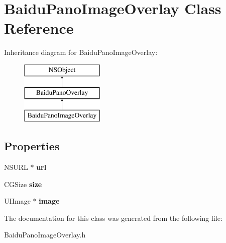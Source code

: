 \hypertarget{interface_baidu_pano_image_overlay}{}\section{Baidu\+Pano\+Image\+Overlay Class Reference}
\label{interface_baidu_pano_image_overlay}
Inheritance diagram for Baidu\+Pano\+Image\+Overlay\+:\begin{figure}[H]
\begin{center}
\leavevmode
\includegraphics[height=3.000000cm]{interface_baidu_pano_image_overlay}
\end{center}
\end{figure}
\subsection*{Properties}
\begin{DoxyCompactItemize}
\item 
\hypertarget{interface_baidu_pano_image_overlay_ac35f2d117bb3368422a657d2d01fcf96}{}N\+S\+U\+R\+L $\ast$ {\bfseries url}\label{interface_baidu_pano_image_overlay_ac35f2d117bb3368422a657d2d01fcf96}

\item 
\hypertarget{interface_baidu_pano_image_overlay_a20b7c4d9c7c0e99953232f49bccbb266}{}C\+G\+Size {\bfseries size}\label{interface_baidu_pano_image_overlay_a20b7c4d9c7c0e99953232f49bccbb266}

\item 
\hypertarget{interface_baidu_pano_image_overlay_ab99543e78c3a3ab3b8eb0b102072efd5}{}U\+I\+Image $\ast$ {\bfseries image}\label{interface_baidu_pano_image_overlay_ab99543e78c3a3ab3b8eb0b102072efd5}

\end{DoxyCompactItemize}


The documentation for this class was generated from the following file\+:\begin{DoxyCompactItemize}
\item 
Baidu\+Pano\+Image\+Overlay.\+h\end{DoxyCompactItemize}
